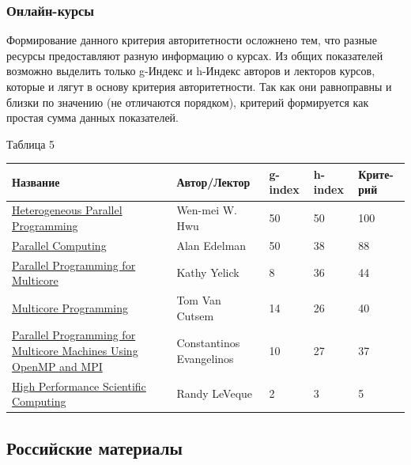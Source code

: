 \documentclass{article}
\begin{document}
		\subsubsection{Онлайн-курсы}
		Формирование данного критерия авторитетности осложнено тем, что разные ресурсы предоставляют разную информацию о курсах. Из общих показателей возможно выделить только g-Индекс и h-Индекс авторов и лекторов курсов, которые и лягут в основу критерия авторитетности. Так как они равноправны и близки по значению (не отличаются порядком), критерий формируется как простая сумма данных показателей.

	\begin{flushleft}
				Таблица 5
				\begin{longtable}{|p{5.5cm}|p{4cm}|p{1.55cm}|p{1.6cm}|p{1.7cm}|}
\hline
Название & Автор/Лектор & g-index & h-index & Крите-рий \\\hline

\href{https://ru.coursera.org/course/hetero}{Heterogeneous Parallel Programming} &
Wen-mei W. Hwu & 50 & 50 & 100\\\hline

\href{http://ocw.mit.edu/courses/mathematics/18-337j-parallel-computing-fall-2011}{Parallel Computing} &
Alan Edelman & 50 & 38 & 88\\\hline

\href{http://www.cs.berkeley.edu/~yelick/cs194f07/main.html}{Parallel Programming for Multicore} &
Kathy Yelick & 8 & 36 & 44\\\hline

\href{http://soft.vub.ac.be/~tvcutsem/multicore}{Multicore Programming} &
Tom Van Cutsem & 14 & 26 & 40\\\hline

\href{http://ocw.mit.edu/courses/earth-atmospheric-and-planetary-sciences/12-950-parallel-programming-for-multicore-machines-using-openmp-and-mpi-january-iap-2010}{Parallel Programming for Multicore Machines Using OpenMP and MPI} &
Constantinos Evangelinos & 10 & 27 & 37\\\hline

\href{https://www.coursera.org/course/scicomp}{High Performance Scientific Computing} &
Randy LeVeque & 2 & 3 & 5\\\hline
				\end{longtable}
			\end{flushleft}
\newpage

	\subsection{Российские материалы}
\end{document}

